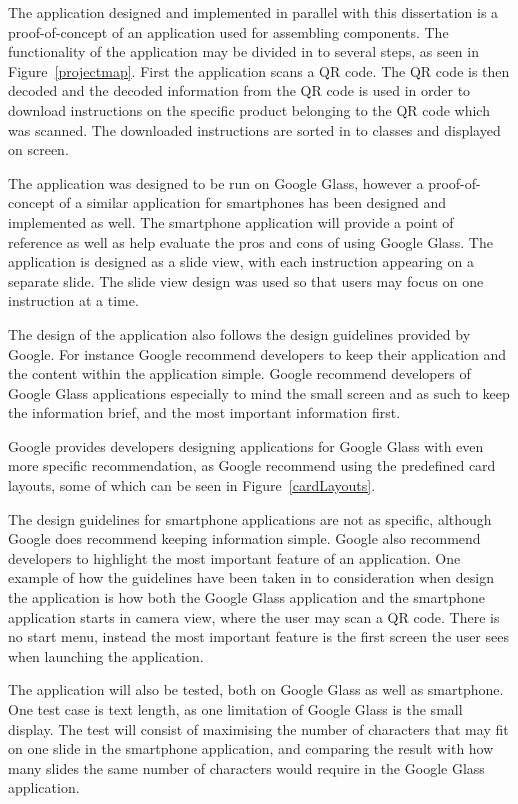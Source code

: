 The application designed and implemented in parallel with this dissertation is a proof-of-concept of an application used for assembling components. The functionality of the application may be divided in to several steps, as seen in Figure~\ref{projectmap}. First the application scans a QR code. The QR code is then decoded and the decoded information from the QR code is used in order to download instructions on the specific product belonging to the QR code which was scanned. The downloaded instructions are sorted in to classes and displayed on screen.

The application was designed to be run on Google Glass, however a proof-of-concept of a similar application for smartphones has been designed and implemented as well. The smartphone application will provide a point of reference as well as help evaluate the pros and cons of using Google Glass. The application is designed as a slide view, with each instruction appearing on a separate slide. The slide view design was used so that users may focus on one instruction at a time.

The design of the application also follows the design guidelines provided by Google. For instance Google recommend developers to keep their application and the content within the application simple. Google recommend developers of Google Glass applications especially to mind the small screen and as such to keep the information brief, and the most important information first.

Google provides developers designing applications for Google Glass with even more specific recommendation, as Google recommend using the predefined card layouts, some of which can be seen in Figure~\ref{cardLayouts}.

The design guidelines for smartphone applications are not as specific, although Google does recommend keeping information simple. Google also recommend developers to highlight the most important feature of an application. One example of how the guidelines have been taken in to consideration when design the application is how both the Google Glass application and the smartphone application starts in camera view, where the user may scan a QR code. There is no start menu, instead the most important feature is the first screen the user sees when launching the application.

The application will also be tested, both on Google Glass as well as smartphone. One test case is text length, as one limitation of Google Glass is the small display. The test will consist of maximising the number of characters that may fit on one slide in the smartphone application, and comparing the result with how many slides the same number of characters would require in the Google Glass application.

